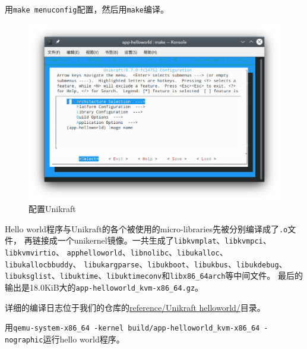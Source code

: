 \documentclass{../runikraft-report}
\begin{document}
用\texttt{make menuconfig}配置，然后用\texttt{make}编译。
\begin{figure}[!hbt]
\centering
\vspace*{-3ex}
\includegraphics[width=0.9\linewidth]{../assets/unikraft-menuconfig}
\vspace*{-3ex}
\caption{配置Unikraft}
\label{fig:unikraft-menuconfig}
\end{figure}
Hello world程序与Unikraft的各个被使用的micro-libraries先被分别编译成了\texttt{.o}文件，
再链接成一个unikernel镜像。一共生成了\texttt{libkvmplat}、\texttt{libkvmpci}、\texttt{libkvmvirtio}、
\texttt{apphelloworld}、\texttt{libnolibc}、\texttt{libukalloc}、\texttt{libukallocbbuddy}、
\texttt{libukargparse}、\texttt{libukboot}、\texttt{libukbus}、\texttt{libukdebug}、
\texttt{libuksglist}、\texttt{libuktime}、\texttt{libuktimeconv}和\texttt{libx86\_64arch}等中间文件。
最后的输出是18.0KiB大的\texttt{app-\linebreak helloworld\_kvm-x86\_64.gz}。

详细的编译日志位于我们的仓库的\href{https://github.com/OSH-2022/x-runikraft/tree/d22ccf0c1b248667148fd8953b71b6e0258de6a3/reference/Unikraft%20helloworld}{reference/Unikraft helloworld/}目录。

用\texttt{qemu-system-x86\_64 -kernel build/app-helloworld\_kvm-x86\_64 -nographic}\linebreak 运行hello world程序。
\end{document}
